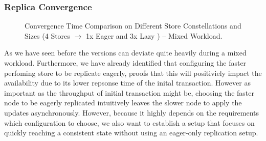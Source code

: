 

\subsubsection{Replica Convergence} 



\begin{figure}[t] 
    \centering 
    \caption{Convergence Time Comparison on Different Store Constellations and Sizes (4 Stores $\rightarrow$ 1x Eager and 3x Lazy ) -- Mixed Workload.}
    \label{fig:store_comparision}
\end{figure}

As we have seen before the versions can deviate quite heavily during a mixed workload. 
Furthermore, we have already identified that configuring the faster perfoming store to be replicate eagerly, proofs that this will positiviely impact 
the availability due to its lower repsonse time of the inital transaction.
However as important as the throughput of initial transaction might be, choosing the faster node to be eagerly replicated intuitively leaves the slower node
to apply the updates asynchronously. 
However, because it highly depends on the requirements which configuration to choose, we also want to establish a setup that focuses on quickly reaching
a consistent state without using an eager-only replication setup.



